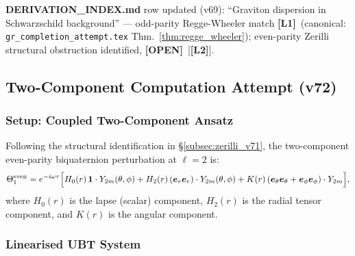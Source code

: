 \documentclass[12pt]{article}
\theoremstyle{definition}
\theoremstyle{remark}
\newcommand{\Lone}{\textbf{[L1]}}
\newcommand{\Ltwo}{\textbf{[L2]}}
\newcommand{\OPEN}{\textbf{[OPEN]}}
\begin{document}
\textbf{DERIVATION\_INDEX.md} row updated (v69):
``Graviton dispersion in Schwarzschild background'' — odd-parity
Regge-Wheeler match \Lone\ (canonical: \texttt{gr\_completion\_attempt.tex}
Thm.~\ref{thm:regge_wheeler}); even-parity Zerilli structural obstruction
identified, \OPEN\ [\Ltwo].

\subsection{Two-Component Computation Attempt (v72)}
\label{subsec:zerilli_two_component}


\subsubsection{Setup: Coupled Two-Component Ansatz}

Following the structural identification in §\ref{subsec:zerilli_v71}, the
two-component even-parity biquaternion perturbation at $\ell = 2$ is:
\begin{equation}
  \Theta_1^{\text{even}}
  = e^{-i\omega\tau}\Bigl[
      H_0(r)\,\mathbf{1}\cdot Y_{2m}(\theta,\phi)
    + H_2(r)\,(\boldsymbol{e}_r\boldsymbol{e}_r)\cdot Y_{2m}(\theta,\phi)
    + K(r)\,(\boldsymbol{e}_\theta\boldsymbol{e}_\theta
             + \boldsymbol{e}_\phi\boldsymbol{e}_\phi)\cdot Y_{2m}
  \Bigr],
  \label{eq:theta1_two_comp_v72}
\end{equation}
where $H_0(r)$ is the lapse (scalar) component, $H_2(r)$ is the radial
tensor component, and $K(r)$ is the angular component.

\subsubsection{Linearised UBT System}
\end{document}
